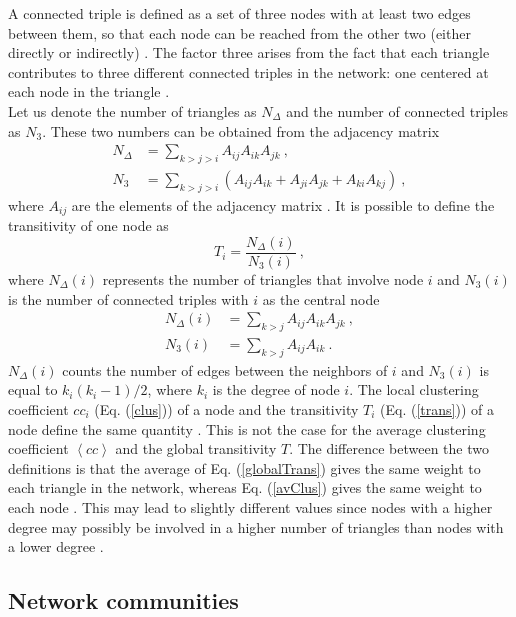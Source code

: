 \documentclass[11 pt , letterpaper , twoside , openright]{book}
\begin{document}
\newline
A connected triple is defined as a set of three nodes with at least two edges between them, so that each node can be reached from the other two (either directly or indirectly) \cite{Newman2003}. The factor three arises from the fact that each triangle contributes to three different connected triples in the network: one centered at each node in the triangle \cite{F.Costa2007}. \\
\newline
Let us denote the number of triangles as $N_{\Delta}$ and the number of connected triples as $N_3$. These two numbers can be obtained from the adjacency matrix
\begin{align}
	N_{\Delta} &= \sum_{k > j > i} A_{ij}A_{ik}A_{jk} \ , \\
	N_3 &= \sum_{k > j > i} (A_{ij}A_{ik} + A_{ji}A_{jk} + A_{ki}A_{kj}) \ ,
\end{align}
\newpage
\noindent
where $A_{ij}$ are the elements of the adjacency matrix \cite{F.Costa2007}. It is possible to define the transitivity of one node as
\begin{equation}\label{trans}
	T_i = \frac{N_{\Delta}(i)}{N_3(i)} \ ,
\end{equation}
where $N_{\Delta}(i)$ represents the number of triangles that involve node $i$ and $N_3(i)$ is the number of connected triples with $i$ as the central node \cite{F.Costa2007}
\begin{align}
	N_{\Delta}(i) &= \sum_{k > j} A_{ij}A_{ik}A_{jk} \ , \\
	N_3(i) &= \sum_{k > j} A_{ij}A_{ik} \ .
\end{align}
$N_{\Delta}(i)$ counts the number of edges between the neighbors of $i$ and $N_3(i)$ is equal to $k_i(k_i-1)/2$, where $k_i$ is the degree of node $i$. The local clustering coefficient $cc_i$ (Eq. (\ref{clus})) of a node and the transitivity $T_i$ (Eq. (\ref{trans})) of a node define the same quantity \cite{F.Costa2007}. This is not the case for the average clustering coefficient $\left<cc\right>$ and the global transitivity $T$. The difference between the two definitions is that the average of Eq. (\ref{globalTrans}) gives the same weight to each triangle in the network, whereas Eq. (\ref{avClus}) gives the same weight to each node \cite{Newman2003}. This may lead to slightly different values since nodes with a higher degree may possibly be involved in a higher number of triangles than nodes with a lower degree \cite{F.Costa2007}.
	
\subsection{Network communities}
\end{document}
